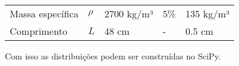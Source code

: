 \begin{longtable}[]{@{}lllll@{}}
\begin{minipage}[t]{0.21\columnwidth}\raggedright
Massa específica\strut
\end{minipage} & \begin{minipage}[t]{0.08\columnwidth}\raggedright
\(\rho\)\strut
\end{minipage} & \begin{minipage}[t]{0.13\columnwidth}\raggedright
2700 kg/m³\strut
\end{minipage} & \begin{minipage}[t]{0.22\columnwidth}\raggedright
5\%\strut
\end{minipage} & \begin{minipage}[t]{0.22\columnwidth}\raggedright
135 kg/m³\strut
\end{minipage}\tabularnewline
\begin{minipage}[t]{0.21\columnwidth}\raggedright
Comprimento\strut
\end{minipage} & \begin{minipage}[t]{0.08\columnwidth}\raggedright
\(L\)\strut
\end{minipage} & \begin{minipage}[t]{0.13\columnwidth}\raggedright
48 cm\strut
\end{minipage} & \begin{minipage}[t]{0.22\columnwidth}\raggedright
-\strut
\end{minipage} & \begin{minipage}[t]{0.22\columnwidth}\raggedright
0.5 cm\strut
\end{minipage}\tabularnewline
\bottomrule
\end{longtable}

Com isso as distribuições podem ser construídas no SciPy.

